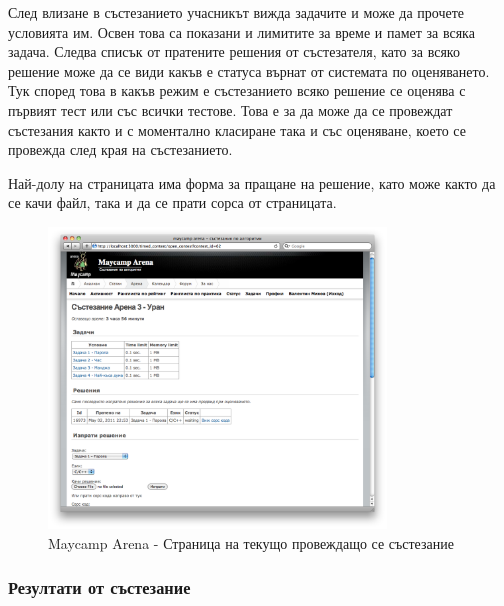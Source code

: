 \documentclass[a4paper,12pt]{article}
\begin{document}
  След влизане в състезанието учасникът вижда задачите и може да прочете условията им. Освен това са показани и лимитите за време и памет за всяка задача. Следва списък от пратените решения от състезателя, като за всяко решение може да се види какъв е статуса върнат от системата по оценяването. Тук според това в какъв режим е състезанието всяко решение се оценява с първият тест или със всички тестове. Това е за да може да се провеждат състезания както и с моментално класиране така и със оценяване, което се провежда след края на състезанието.
  
  Най-долу на страницата има форма за пращане на решение, като може както да се качи файл, така и да се прати сорса от страницата.

  \begin{figure}[ht]
    \begin{center}
      \includegraphics[width=0.8\textwidth]{images/maycamp_arena_contest.png}
    \end{center}
    \caption{Maycamp Arena - Страница на текущо провеждащо се състезание}
    \label{arena_contest_page}
  \end{figure}
  
  \pagebreak
  
  \subsubsection{Резултати от състезание}
\end{document}
